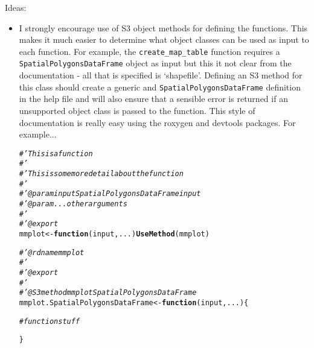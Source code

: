 \documentclass[letterpaper,12pt]{article}\usepackage[]{graphicx}\usepackage[]{color}
\makeatletter
\newcommand{\hlcom}[1]{\textcolor[rgb]{0.678,0.584,0.686}{\textit{#1}}}%
\newcommand{\hlstd}[1]{\textcolor[rgb]{0.345,0.345,0.345}{#1}}%
\newcommand{\hlkwa}[1]{\textcolor[rgb]{0.161,0.373,0.58}{\textbf{#1}}}%
\newcommand{\hlkwb}[1]{\textcolor[rgb]{0.69,0.353,0.396}{#1}}%
\newcommand{\hlkwc}[1]{\textcolor[rgb]{0.333,0.667,0.333}{#1}}%
\newcommand{\hlkwd}[1]{\textcolor[rgb]{0.737,0.353,0.396}{\textbf{#1}}}%
\newenvironment{kframe}{%
 \def\at@end@of@kframe{}%
 \ifinner\ifhmode%
  \def\at@end@of@kframe{\end{minipage}}%
  \begin{minipage}{\columnwidth}%
 \fi\fi%
 \def\FrameCommand##1{\hskip\@totalleftmargin \hskip-\fboxsep
 \colorbox{shadecolor}{##1}\hskip-\fboxsep
     \hskip-\linewidth \hskip-\@totalleftmargin \hskip\columnwidth}%
 \MakeFramed {\advance\hsize-\width
   \@totalleftmargin\z@ \linewidth\hsize
   \@setminipage}}%
 {\par\unskip\endMakeFramed%
 \at@end@of@kframe}
\makeatother
\begin{document}
Ideas:
\begin{itemize}
\item I strongly encourage use of S3 object methods for defining the functions.  This makes it much easier to determine what object classes can be used as input to each function.  For example, the \texttt{create\_map\_table} function requires a \texttt{SpatialPolygonsDataFrame} object as input but this it not clear from the documentation - all that is specified is `shapefile'. Defining an S3 method for this class should create a generic and \texttt{SpatialPolygonsDataFrame} definition in the help file and will also ensure that a sensible error is returned if an unsupported object class is passed to the function.  This style of documentation is really easy using the roxygen and devtools packages.  
For example...
\begin{kframe}
\begin{alltt}
\hlcom{#' This is a function}
\hlcom{#'}
\hlcom{#' This is some more detail about the function}
\hlcom{#'}
\hlcom{#' @param input SpatialPolygonsDataFrame input}
\hlcom{#' @param ... other arguments}
\hlcom{#' }
\hlcom{#' @export}
\hlstd{mmplot} \hlkwb{<-} \hlkwa{function}\hlstd{(}\hlkwc{input}\hlstd{,} \hlkwc{...}\hlstd{)} \hlkwd{UseMethod}\hlstd{(mmplot)}

\hlcom{#' @rdname mmplot}
\hlcom{#'}
\hlcom{#' @export}
\hlcom{#'}
\hlcom{#' @S3method mmplot SpatialPolygonsDataFrame}
\hlstd{mmplot.SpatialPolygonsDataFrame} \hlkwb{<-} \hlkwa{function}\hlstd{(}\hlkwc{input}\hlstd{,} \hlkwc{...}\hlstd{)\{}

  \hlcom{# function stuff}

\hlstd{\}}
\end{alltt}
\end{kframe}



\end{itemize}
\end{document}
